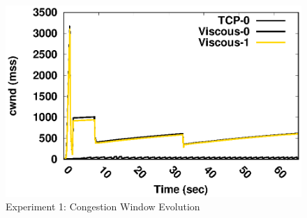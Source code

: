 \begin{figure}[!t]
	\centering
	\includegraphics[width=\linewidth]{img/exp6/cwnd_sample1_5_20}
	\caption{Experiment 1: Congestion Window Evolution}
	\label{fig:exp6_cwnd}
\end{figure}

%
%


